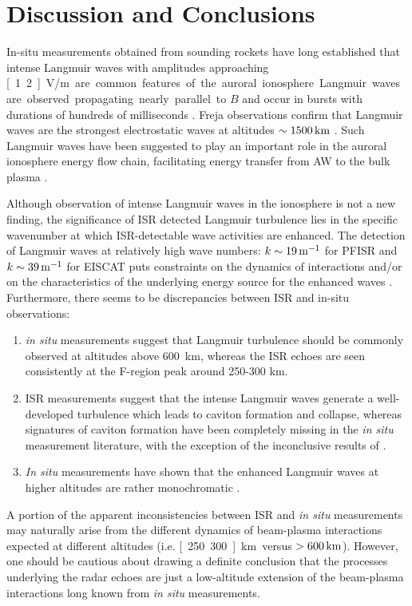 \section{Discussion and Conclusions}\label{sec:disc}
In-situ measurements obtained from sounding rockets have long established that intense Langmuir waves with amplitudes approaching \unit[1.2]{V/m} are common features of the auroral ionosphere. 
Langmuir waves are observed propagating nearly parallel to $B$ and occur in bursts with durations of hundreds of milliseconds \citep{mcfadden1986,boehm1984,ergun1999a,ergun1999b}.
Freja observations confirm that Langmuir waves are the strongest electrostatic waves at altitudes $\sim \unit[1500]{km}$ \citep{stasiewicz1996}.
Such Langmuir waves have been suggested to play an important role in the auroral ionosphere energy flow chain, facilitating energy transfer from AW to the bulk plasma \citep{stasiewicz1996}.

Although observation of intense Langmuir waves in the ionosphere is not a new finding, the significance of ISR detected Langmuir turbulence lies in the specific wavenumber at which ISR-detectable wave activities are enhanced. 
The detection of Langmuir waves at relatively high wave numbers: $k \sim \unit[19]{m^{-1}}$ for PFISR and $k \sim \unit[39]{m^{-1}}$  for EISCAT puts constraints on the dynamics of interactions and/or on the characteristics of the underlying energy source for the enhanced waves \citep{akbari2014}.
Furthermore, there seems to be discrepancies between ISR and in-situ observations:
\begin{enumerate}
    \item \textit{in situ} measurements suggest that Langmuir turbulence should be commonly observed at altitudes above 600~km, whereas the ISR echoes are seen consistently at the F-region peak around 250-300 km.
    \item ISR measurements suggest that the intense Langmuir waves generate a well-developed turbulence which leads to caviton formation and collapse, whereas signatures of caviton formation have been completely missing in the \textit{in situ} measurement literature, with the exception of the inconclusive results of \citet{boehm1984}.
    \item \textit{In situ} measurements have shown that the enhanced Langmuir waves at higher altitudes are rather monochromatic \citep{ergun1999a,ergun1999b}. 
\end{enumerate}

A portion of the apparent inconsistencies between ISR and \textit{in situ} measurements may naturally arise from the different dynamics of beam-plasma interactions expected at different altitudes (i.e. \unit[250..300]{km} versus $>\unit[600]{km}$).
However, one should be cautious about drawing a definite conclusion that the processes underlying the radar echoes are just a low-altitude extension of the beam-plasma interactions long known from \textit{in situ} measurements.

